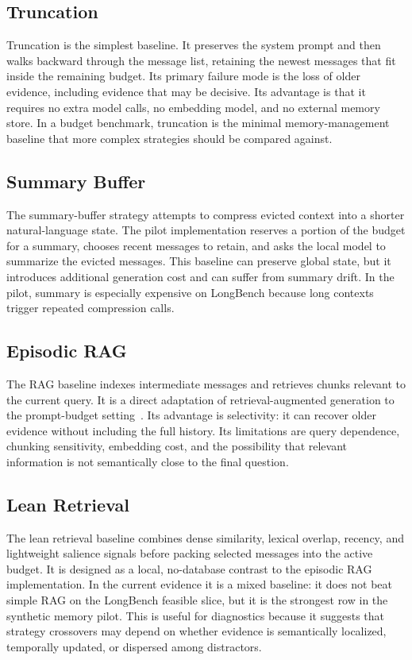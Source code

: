 \documentclass[11pt]{article}
\begin{document}
\subsection{Truncation}

Truncation is the simplest baseline.  It preserves the system prompt and then
walks backward through the message list, retaining the newest messages that fit
inside the remaining budget.  Its primary failure mode is the loss of older
evidence, including evidence that may be decisive.  Its advantage is that it
requires no extra model calls, no embedding model, and no external memory
store.  In a budget benchmark, truncation is the minimal memory-management
baseline that more complex strategies should be compared against.

\subsection{Summary Buffer}

The summary-buffer strategy attempts to compress evicted context into a
shorter natural-language state.  The pilot implementation reserves a portion
of the budget for a summary, chooses recent messages to retain, and asks the
local model to summarize the evicted messages.  This baseline can preserve
global state, but it introduces additional generation cost and can suffer from
summary drift.  In the pilot, summary is especially expensive on LongBench
because long contexts trigger repeated compression calls.

\subsection{Episodic RAG}

The RAG baseline indexes intermediate messages and retrieves chunks relevant
to the current query.  It is a direct adaptation of retrieval-augmented
generation to the prompt-budget setting~\citep{lewis2020rag}.  Its advantage
is selectivity: it can recover older evidence without including the full
history.  Its limitations are query dependence, chunking sensitivity, embedding
cost, and the possibility that relevant information is not semantically close
to the final question.

\subsection{Lean Retrieval}

The lean retrieval baseline combines dense similarity, lexical overlap,
recency, and lightweight salience signals before packing selected messages
into the active budget.  It is designed as a local, no-database contrast to
the episodic RAG implementation.  In the current evidence it is a mixed
baseline: it does not beat simple RAG on the LongBench feasible slice, but it
is the strongest row in the synthetic memory pilot.  This is useful for
diagnostics because it suggests that strategy crossovers may depend on
whether evidence is semantically localized, temporally updated, or dispersed
among distractors.
\end{document}
